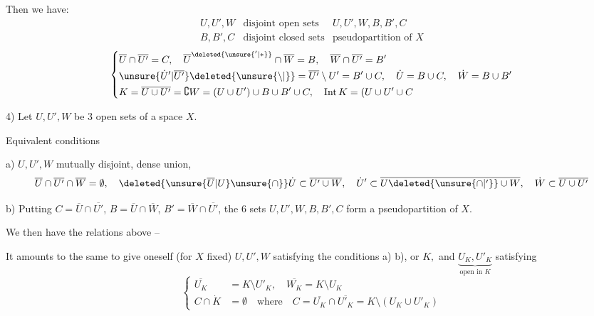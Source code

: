 Then we have:
\[
\begin{array}{ll|l}
 U,U',W&\text{disjoint open sets}& U,U',W,B,B',C\\
 B,B',C&\text{disjoint closed sets}&\text{pseudopartition of }X
\end{array}
\]
\[
\left\{\begin{aligned}
 &\overline U\cap\overline{U'}=C,\quad
 \overline U^{\deleted{\unsure{'|*}}}\cap\overline W=B,\quad
 \overline W\cap\overline{U'}=B'\\
 &\unsure{\dot U'|\overline{U'}}\deleted{\unsure{\setminus|{}}}=\overline{U'}\setminus U'=B'\cup C,\quad
 \dot U=B\cup C,\quad \dot W=B\cup B'\\
 &K=\overline{U\cup U'}=\complement W=(U\cup U')\cup B\cup B'\cup C,\quad
 \mathrm{Int}\,K=(U\cup U'\cup C
\end{aligned}\right.
\]

4)  Let $U,U',W$ be 3 open sets of a space $X$.

Equivalent conditions

a) $U,U',W$ mutually disjoint, dense union,
\[
 \overline U\cap\overline{U'}\cap\overline W=\emptyset,\quad
 \deleted{\unsure{\overline U|U}\unsure{\cap}}\dot U\subset\overline{U'\cup W},\quad
 \dot U'\subset\overline{U\deleted{\unsure{\cap|'}}\cup W},\quad
 \dot W\subset\overline{U\cup U'}
\]

b) Putting $C=\overline U\cap\overline{U'}$, $B=\overline U\cap\overline W$, $B'=\overline W\cap\overline{U'}$, the 6 sets $U,U',W,B,B',C$ form a pseudopartition of $X$.

We then have the relations above --

It amounts to the same to give oneself (for $X$ fixed) $U,U',W$ satisfying the  conditions a) b), or $K,$  and $\underbrace{U_K,U'_K}_{\text{open in }K}$ satisfying
\[
\left\{\begin{aligned}
 \overline{U_K}&=K\setminus U'_K,\quad \overline{W_K}=K\setminus U_K\\
 C\cap\dot K&=\emptyset\quad \text{where}\quad C=\overline{U_K}\cap\overline{U'_K}=K\setminus(U_K\cup U'_K)
\end{aligned}\right.
\]
